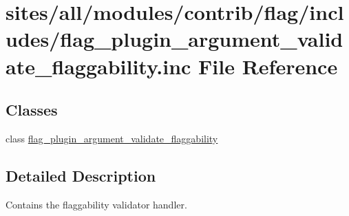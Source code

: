 \hypertarget{flag__plugin__argument__validate__flaggability_8inc}{
\section{sites/all/modules/contrib/flag/includes/flag\_\-plugin\_\-argument\_\-validate\_\-flaggability.inc File Reference}
\label{flag__plugin__argument__validate__flaggability_8inc}
}
\subsection*{Classes}
\begin{CompactItemize}
\item 
class \hyperlink{classflag__plugin__argument__validate__flaggability}{flag\_\-plugin\_\-argument\_\-validate\_\-flaggability}
\end{CompactItemize}


\subsection{Detailed Description}
Contains the flaggability validator handler. 